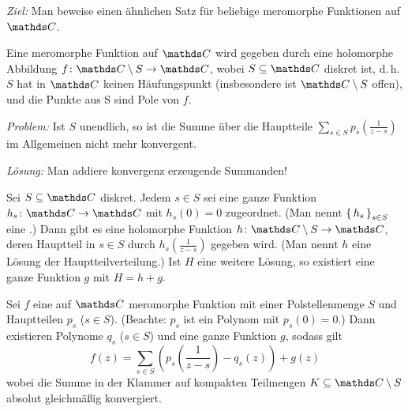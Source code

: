 \emph{Ziel:} Man beweise einen ähnlichen Satz für beliebige meromorphe Funktionen auf $\CC$.

\begin{erin*}
Eine meromorphe Funktion auf $\CC$ wird gegeben durch eine holomorphe Abbildung $f\colon \CC\setminus S \ra \CC$, wobei $S\subseteq \CC$ diskret ist, d.\,h. $S$ hat in $\CC$ keinen Häufungspunkt (insbesondere ist $\CC\setminus S$ offen), und die Punkte aus S sind Pole von $f$.
\end{erin*}

\noindent\emph{Problem:} Ist $S$ unendlich, so ist die Summe über die Hauptteile $\sum _{s \in S} p_s(\frac{1}{z-s})$ im Allgemeinen nicht mehr konvergent.

\noindent\emph{Lösung:} Man addiere konvergenz erzeugende Summanden!

\begin{satz-list}
\item Sei $S\subseteq\CC$ diskret. Jedem $s \in S$ sei eine ganze Funktion $h_s\colon \CC \ra \CC$ mit $h_s(0) = 0$ zugeordnet.
(Man nennt $\left\{\,h_s\,\right\}_{s \in S}$ eine .)
Dann gibt es eine holomorphe Funktion $h\colon \CC\setminus S \ra \CC$, deren Hauptteil in $s\in S$ durch $h_s(\frac{1}{z-s})$ gegeben wird.
(Man nennt $h$ eine Lösung der Hauptteilverteilung.)
Ist $H$ eine weitere Lösung, so existiert eine ganze Funktion $g$ mit $H = h + g$.
\item Sei $f$ eine auf $\CC$ meromorphe Funktion mit einer Polstellenmenge $S$ und Hauptteilen $p_s$ ($s\in S$).
(Beachte: $p_s$ ist ein Polynom mit $p_s(0) = 0$.)
Dann existieren Polynome $q_s$ ($s \in S$) und eine ganze Funktion $g$, sodass gilt
\[
	f(z) = \sum \limits _{s\in S} \left(p_s\left(\frac{1}{z-s}\right) - q_s(z)\right) + g(z)
\]
wobei die Summe in der Klammer auf kompakten Teilmengen $K \subseteq \CC \setminus S$ absolut gleichmäßig konvergiert.
\end{satz-list}

